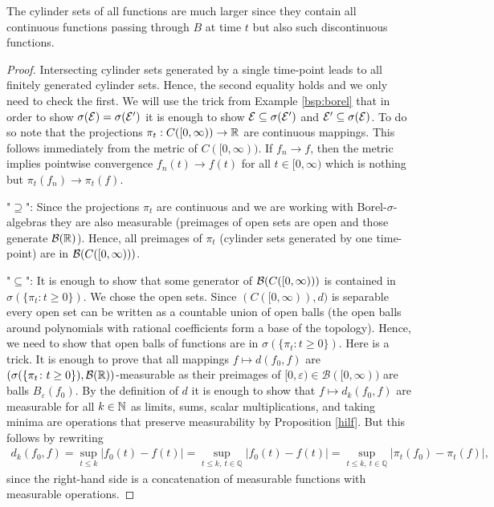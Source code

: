 The cylinder sets of all functions are much larger since they contain all continuous functions passing through $B$ at time $t$ but also such discontinuous functions.
\begin{proof}[Proof]
	Intersecting cylinder sets generated by a single time-point leads to all finitely generated cylinder sets. Hence, the second equality holds and we only need to check the first. We will use the trick from Example \ref{bsp:borel} that in order to show $\sigma(\mathcal{E})=\sigma(\mathcal{E}')$ it is enough to show $\mathcal{E}\subseteq \sigma(\mathcal{E}')$ and $\mathcal{E}'\subseteq \sigma(\mathcal{E})$. To do so note that the projections $\pi_t:C([0,\infty))\to \mathbb{R}$ are continuous mappings. This follows immediately from the metric of $C([0,\infty))$. If $f_n\to f$, then the metric implies pointwise convergence $f_n(t)\to f(t)$ for all $t\in [0,\infty)$ which is nothing but $\pi_t(f_n)\to \pi_t(f)$. \smallskip


	"$\supseteq$"{}: Since the projections $\pi_t$ are continuous and we are working with Borel-$\sigma$-algebras they are also measurable (preimages of open sets are open and those generate $\mathcal B(\mathbb{R})$). Hence, all preimages of $\pi_t$ (cylinder sets generated by one time-point) are in $\mathcal{B} ( C([0,\infty)))$.\smallskip
	
	"$\subseteq$"{}: It is enough to show that some generator of $\mathcal{B} ( C([0,\infty)))$ is contained in $\sigma(\{ \pi_t \colon t \geq 0 \})$. We chose the open sets. Since $(C([0,\infty)),d)$ is separable every open set can be written as a countable union of open balls (the open balls around polynomials with rational coefficients form a base of the topology). Hence, we need to show that open balls of functions are in $\sigma(\{ \pi_t \colon t \geq 0 \})$. Here is a trick. It is enough to prove that all mappings $f\mapsto d(f_0,f)$ are $(\sigma(\{ \pi_t \colon t \geq 0 \}),\mathcal B(\mathbb{R}))$-measurable as their preimages of $[0,\varepsilon)\in \mathcal B([0,\infty))$ are balls $B_{\varepsilon}(f_0)$. By the definition of $d$ it is enough to show that $f\mapsto d_k(f_0,f)$ are measurable for all $k\in\mathbb{N}$ as limits, sums, scalar multiplications, and taking minima are operations that preserve measurability by Proposition \ref{hilf}. But this follows by rewriting
	\begin{align*}
		d_k(f_0,f) = \sup_{t\leq k} | f_0(t)- f(t) | 
		= \sup_{t\leq k,\:t\in\mathbb{Q}} | f_0(t)- f(t) |  
		= \sup_{t\leq k,\:t\in\mathbb{Q}} | \pi_t(f_0) - \pi_t(f) |,
	\end{align*}
	since the right-hand side is a concatenation of measurable functions with measurable operations.
\end{proof}
